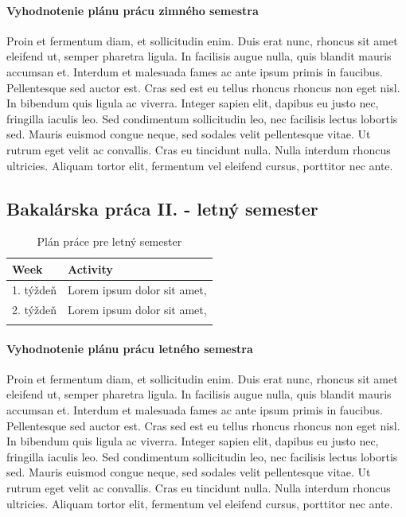 \paragraph{Vyhodnotenie plánu prácu zimného semestra}
Proin et fermentum diam, et sollicitudin enim. Duis erat nunc, rhoncus sit amet eleifend ut, semper pharetra ligula. In facilisis augue nulla, quis blandit mauris accumsan et. Interdum et malesuada fames ac ante ipsum primis in faucibus. Pellentesque sed auctor est. Cras sed est eu tellus rhoncus rhoncus non eget nisl. In bibendum quis ligula ac viverra. Integer sapien elit, dapibus eu justo nec, fringilla iaculis leo. Sed condimentum sollicitudin leo, nec facilisis lectus lobortis sed. Mauris euismod congue neque, sed sodales velit pellentesque vitae. Ut rutrum eget velit ac convallis. Cras eu tincidunt nulla. Nulla interdum rhoncus ultricies. Aliquam tortor elit, fermentum vel eleifend cursus, porttitor nec ante.

\subsection*{Bakalárska práca II. - letný semester}
\begin{table}[H]
\centering
\begin{tabularx}{\textwidth}{lX}
\textbf{Week} & \textbf{Activity} \\
\hline
1. týždeň & Lorem ipsum dolor sit amet, \\
2. týždeň & Lorem ipsum dolor sit amet, \\
 \\

\hline
\end{tabularx}
\caption{Plán práce pre letný semester}
\label{tab:summer2-plan}
\end{table}

\paragraph{Vyhodnotenie plánu prácu letného semestra}
Proin et fermentum diam, et sollicitudin enim. Duis erat nunc, rhoncus sit amet eleifend ut, semper pharetra ligula. In facilisis augue nulla, quis blandit mauris accumsan et. Interdum et malesuada fames ac ante ipsum primis in faucibus. Pellentesque sed auctor est. Cras sed est eu tellus rhoncus rhoncus non eget nisl. In bibendum quis ligula ac viverra. Integer sapien elit, dapibus eu justo nec, fringilla iaculis leo. Sed condimentum sollicitudin leo, nec facilisis lectus lobortis sed. Mauris euismod congue neque, sed sodales velit pellentesque vitae. Ut rutrum eget velit ac convallis. Cras eu tincidunt nulla. Nulla interdum rhoncus ultricies. Aliquam tortor elit, fermentum vel eleifend cursus, porttitor nec ante.